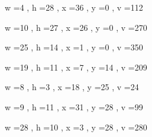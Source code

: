 \documentclass[11pt]{article}
\begin{document}
w =4 , h =28 , x =36 , y =0 , v =112
\par
w =10 , h =27 , x =26 , y =0 , v =270
\par
w =25 , h =14 , x =1 , y =0 , v =350
\par
w =19 , h =11 , x =7 , y =14 , v =209
\par
w =8 , h =3 , x =18 , y =25 , v =24
\par
w =9 , h =11 , x =31 , y =28 , v =99
\par
w =28 , h =10 , x =3 , y =28 , v =280
\par
\newpage
\end{document}
